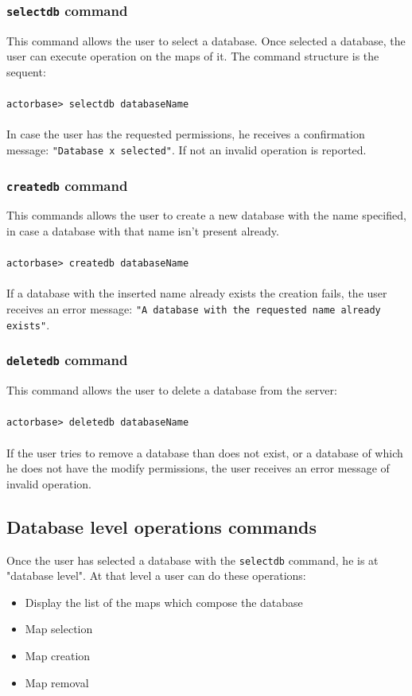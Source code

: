 \documentclass[a4paper]{article}
\begin{document}
	\subsubsection{\texttt{selectdb} command}
	This command allows the user to select a database. Once selected a database, the user can execute operation on the maps of it. The command structure is the sequent:
	\\ \\
	\texttt{actorbase>	selectdb databaseName}
	\\ \\
	In case the user has the requested permissions, he receives a confirmation message: \texttt{"Database x selected"}. If not an invalid operation is reported.

	\subsubsection{\texttt{createdb} command}
	This commands allows the user to create a new database with the name specified, in case a database with that name isn't present already.
	\\ \\
	\texttt{actorbase>	createdb databaseName}
	\\ \\
	If a database with the inserted name already exists the creation fails, the user receives an error message: \texttt{"A database with the requested name already exists"}.

	\subsubsection{\texttt{deletedb} command}
	This command allows the user to delete a database from the server:
	\\ \\
	\texttt{actorbase>	deletedb databaseName}
	\\ \\
	If the user tries to remove a database than does not exist, or a database of which he does not have the modify permissions, the user receives an error message of invalid operation.
	

	\subsection{Database level operations commands}
	Once the user has selected a database with the \texttt{selectdb} command, he is at "database level". At that level a user can do these operations:
	\begin{itemize}
		\item Display the list of the maps which compose the database
		\item Map selection
		\item Map creation
		\item Map removal
	\end{itemize}
\end{document}
